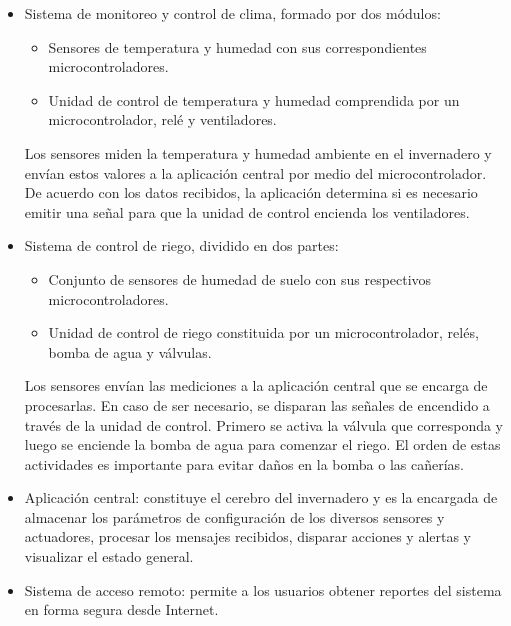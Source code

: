 \begin{itemize}
\item Sistema de monitoreo y control de clima, formado por dos módulos:
\begin{itemize}
\item Sensores de temperatura y humedad con sus correspondientes microcontroladores.
\item Unidad de control de temperatura y humedad comprendida por un microcontrolador, relé y ventiladores. 
\end{itemize}
Los sensores miden la temperatura y humedad ambiente en el invernadero y envían estos valores a la aplicación central por medio del microcontrolador. De acuerdo con los datos recibidos, la aplicación determina si es necesario emitir una señal para que la unidad de control encienda los ventiladores.



\item Sistema de control de riego, dividido en dos partes:
\begin{itemize}
\item Conjunto de sensores de humedad de suelo con sus respectivos microcontroladores.
\item Unidad de control de riego constituida por un microcontrolador, relés, bomba de agua y válvulas.
\end{itemize}

Los sensores envían las mediciones a la aplicación central que se encarga de procesarlas. En caso de ser necesario, se disparan las señales de encendido a través de la unidad de control. Primero se activa la válvula que corresponda y luego se enciende la bomba de agua para comenzar el riego. El orden de estas actividades es importante para evitar daños en la bomba o las cañerías.

\item Aplicación central: constituye el cerebro del invernadero y es la encargada de almacenar los parámetros de configuración de los diversos sensores y actuadores, procesar los mensajes recibidos, disparar acciones y alertas y visualizar el estado general.

\item Sistema de acceso remoto: permite a los usuarios obtener reportes del sistema en forma segura desde Internet.   
\end{itemize}



